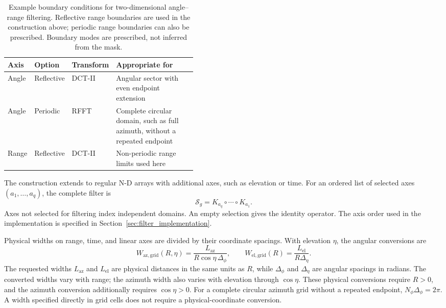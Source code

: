 \documentclass[a4paper,fleqn]{cas-sc}
\begin{document}
\begin{table}[htbp]
	\centering
	\caption{Example boundary conditions for two-dimensional angle--range filtering. Reflective range boundaries are used in the construction above; periodic range boundaries can also be prescribed. Boundary modes are prescribed, not inferred from the mask.}
	\label{tab:boundary_modes}
	\begin{tabular}{@{}lllp{0.43\linewidth}@{}}
		\toprule
		Axis    & Option     & Transform & Appropriate for                 \\
		\midrule
		Angle   & Reflective & DCT-II    & Angular sector with even endpoint extension \\
		Angle   & Periodic   & RFFT      & Complete circular domain, such as full azimuth, without a repeated endpoint \\
		Range   & Reflective & DCT-II    & Non-periodic range limits used here \\
		\bottomrule
	\end{tabular}
\end{table}

The construction extends to regular N-D arrays with additional axes, such as elevation or time. For an ordered list of selected axes $(a_1,\ldots,a_q)$, the complete filter is
\begin{equation}
	\mathcal{S}_g=K_{a_q}\circ\cdots\circ K_{a_1}.
	\label{eq:nd_polar_operator}
\end{equation}
Axes not selected for filtering index independent domains. An empty selection gives the identity operator. The axis order used in the implementation is specified in Section~\ref{sec:filter_implementation}.

Physical widths on range, time, and linear axes are divided by their coordinate spacings. With elevation $\eta$, the angular conversions are
\begin{equation}
	W_{\mathrm{az,grid}}(R,\eta)=\frac{L_{\mathrm{az}}}{R\cos\eta\,\Delta_\phi}, \qquad
	W_{\mathrm{el,grid}}(R)=\frac{L_{\mathrm{el}}}{R\Delta_\eta}.
	\label{eq:nd_polar_widths}
\end{equation}
The requested widths $L_{\mathrm{az}}$ and $L_{\mathrm{el}}$ are physical distances in the same units as $R$, while $\Delta_\phi$ and $\Delta_\eta$ are angular spacings in radians. The converted widths vary with range; the azimuth width also varies with elevation through $\cos\eta$. These physical conversions require $R>0$, and the azimuth conversion additionally requires $\cos\eta>0$. For a complete circular azimuth grid without a repeated endpoint, $N_\phi\Delta_\phi=2\pi$. A width specified directly in grid cells does not require a physical-coordinate conversion.
\end{document}
